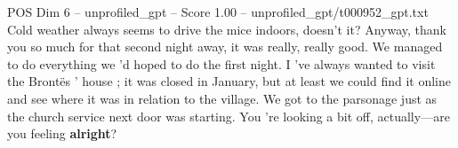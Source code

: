 \begin{textsample}{POS Dim 6 – unprofiled\_gpt – Score 1.00 – unprofiled\_gpt/t000952\_gpt.txt}  \label{ex:f6_pos_030}
Cold weather always seems to drive the mice indoors, doesn't it?
Anyway, thank you so much for that second night away, it was really, really good.
We managed to do everything we ’d hoped to do the first night.
I ’ve always wanted to visit the Brontës ’ house ; it was closed in January, but at least we could find it online and see where it was in relation to the village.
We got to the parsonage just as the church service next door was starting.
You ’re looking a bit off, actually—are you feeling \textbf{alright}?

\end{textsample}
